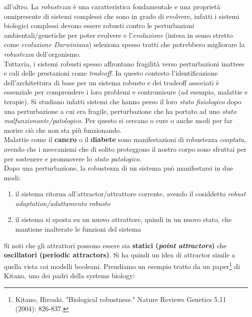 \documentclass[a4paper,12pt, oneside]{book}
\begin{document}
all'altro. La \textit{robustezza} è una caratteristica fondamentale e una
proprietà onnipresente di sistemi complessi che sono in grado di evolvere,
infatti i sistemi biologici complessi devono essere robusti contro le
perturbazioni ambientali/genetiche per poter evolvere e l'\textit{evoluzione}
(intesa in senso stretto come \textit{evoluzione Darwiniana})
seleziona 
spesso tratti che potrebbero migliorare la \textit{robustezza}
dell'organismo. \\
Tuttavia, i sistemi robusti spesso affrontano fragilità verso perturbazioni inattese e cali
delle prestazioni come \textit{tradeoff}. In questo contesto l'identificazione
dell'architettura di base per un sistema robusto e dei tradeoff associati è
essenziale per comprendere i loro problemi e contromisure (ad esempio, malattie
e terapie). Si studiano infatti sistemi che hanno perso il loro \textit{stato
  fisiologico} dopo una perturbazione a cui era fragile, perturbazione che ha
portato ad uno \textit{stato malfunzionante/patologico}. Per questo si cercano o
cure o 
anche modi per far morire ciò che non sta più funzionando.\\
Malattie come il \textbf{cancro} o il \textbf{diabete} sono manifestazioni di
robustezza \textit{cooptata}, avendo che i meccanismi che di solito proteggono
il nostro corpo sono sfruttai per per sostenere e promuovere lo \textit{stato
  patologico}. \\
Dopo una perturbazione, la robustezza di un sistema può manifestarsi in due
modi:
\begin{enumerate}
  \item il sistema ritorna all'attractor/attrattore corrente, avendo il
  cosiddetto 
  \textit{robust adaptation/adattamento robusto}
  \item il sistema si sposta su un nuovo attrattore, quindi in un nuovo stato,
  che mantiene inalterate le funzioni del sistema 
\end{enumerate}
Si noti che gli attrattori possono essere sia \textbf{statici (\textit{point
    attractors})} che \textbf{oscillatori (periodic attractors)}. Si ha quindi
un idea di attractor simile a quella vista coi modelli booleani.
\newpage
Prendiamo un esempio tratto da un paper\footnote{Kitano, Hiroaki. "Biological
  robustness." Nature Reviews Genetics 5.11 (2004): 826-837.} di Kitano, uno dei
padri della systems biology:
\end{document}

